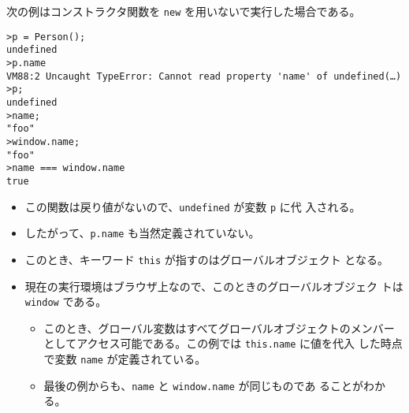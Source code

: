 \begin{Exec}\upshape
次の例はコンストラクタ関数を \verb+new+ を用いないで実行した場合である。
\begin{Verbatim}
>p = Person();
undefined
>p.name
VM88:2 Uncaught TypeError: Cannot read property 'name' of undefined(…)
>p;
undefined
>name;
"foo"
>window.name;
"foo"
>name === window.name
true
\end{Verbatim}
\begin{itemize}\upshape
 \item この関数は戻り値がないので、\verb+undefined+ が変数 \verb+p+ に代
       入される。
 \item したがって、\texttt{p.name} も当然定義されていない。
 \item このとき、キーワード \verb+this+ が指すのはグローバルオブジェクト
       となる。
 \item 現在の実行環境はブラウザ上なので、このときのグローバルオブジェク
       トは \verb+window+ である。
 \begin{itemize}
  \item このとき、グローバル変数はすべてグローバルオブジェクトのメンバー
	としてアクセス可能である。この例では \verb+this.name+ に値を代入
	した時点で変数 \verb+name+ が定義されている。
  \item 最後の例からも、\verb+name+ と \verb+window.name+ が同じものであ
	ることがわかる。
 \end{itemize}
\end{itemize}
\end{Exec}
\iffalse
\begin{Prob}
実行例\ref{constructor}を次のように変える。
\begin{Verbatim}
function Person(D){
  this.name = "foo";
  this.birthday = {
    year : 2001,
    month : 4,
    day : 1
  };
  this["hometown"] = "神奈川";
  return D;
}
\end{Verbatim}
これに対して次のように実行したとき、作成されるオブジェクトは
 何か答えよ。
\begin{enumerate}
 \item \verb+p = new Person(1);+
 \item \verb+p = new Person([1,2,3]);+
 \item \verb+p = new Person({o:"1"});+
 \item \verb+p = new Person(function(){return 2;});+
 \item \verb+p = new Person(new function(){this.a = "a"});+
\end{enumerate}
\end{Prob}
\fi
